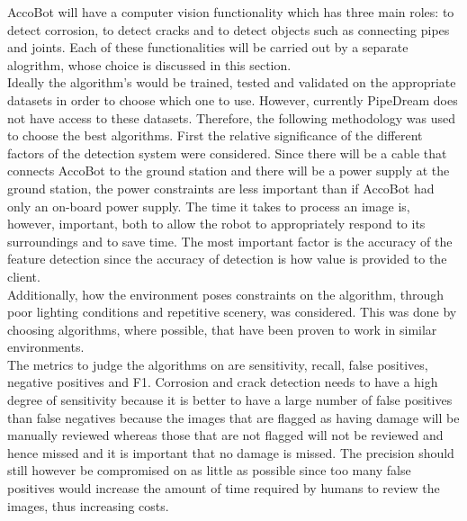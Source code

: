 \documentclass[11pt]{article}		%
\begin{document}
			AccoBot will have a computer vision functionality which has three main roles: to detect corrosion, to detect cracks and to detect objects such as connecting pipes and joints. Each of these functionalities will be carried out by a separate alogrithm, whose choice is discussed in this section.
			\\
	        \hspace*{2ex}Ideally the algorithm's would be trained, tested and validated on the appropriate datasets in order to choose which one to use. However, currently PipeDream does not have access to these datasets. Therefore, the following methodology was used to choose the best algorithms. First the relative significance of the different factors of the detection system were considered. Since there will be a cable that connects AccoBot to the ground station and there will be a power supply at the ground station, the power constraints are less important than if AccoBot had only an on-board power supply. The time it takes to process an image is, however, important, both to allow the robot to appropriately respond to its surroundings and to save time. The most important factor is the accuracy of the feature detection since the accuracy of detection is how value is provided to the client. 
			\\
	        \hspace*{2ex}Additionally, how the environment poses constraints on the algorithm, through poor lighting conditions and repetitive scenery, was considered. This was done by choosing algorithms, where possible, that have been proven to work in similar environments. 
	        	\\
	        \hspace*{2ex}
	        The metrics to judge the algorithms on are sensitivity, recall, false positives, negative positives and F1. Corrosion and crack detection needs to have a high degree of sensitivity because it is better to have a large number of false positives than false negatives because the images that are flagged as having damage will be manually reviewed whereas those that are not flagged will not be reviewed and hence missed and it is important that no damage is missed. The precision should still however be compromised on as little as possible since too many false positives would increase the amount of time required by humans to review the images, thus increasing costs. 
\end{document}
